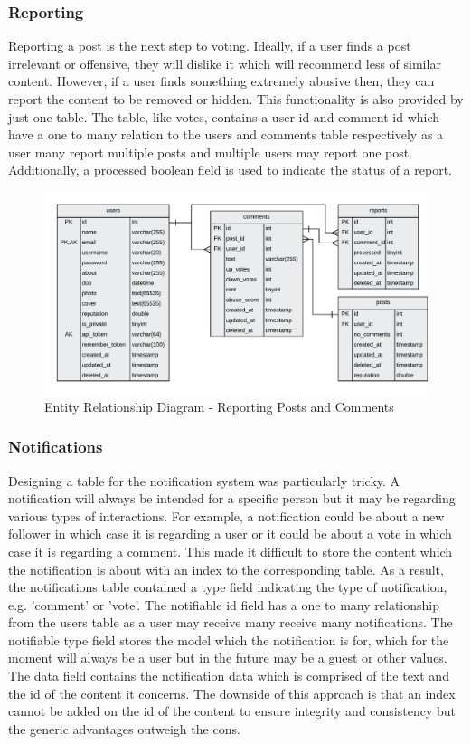 \subsubsection{Reporting}
Reporting a post is the next step to voting. Ideally, if a user finds a post irrelevant or offensive, they will dislike it which will recommend less of similar content. However, if a user finds something extremely abusive then, they can report the content to be removed or hidden. This functionality is also provided by just one table. The table, like votes, contains a user id and comment id which have a one to many relation to the users and comments table respectively as a user many report multiple posts and multiple users may report one post. Additionally, a processed boolean field is used to indicate the status of a report. 

\begin{figure}[H]
  \centering
  \includegraphics[width=1.0\textwidth]{Images/Design/Database/Reports}
  \caption{Entity Relationship Diagram - Reporting Posts and Comments} \label{fig:ERD_Reporting}
\end{figure}

\subsubsection{Notifications}
Designing a table for the notification system was particularly tricky. A notification will always be intended for a specific person but it may be regarding various types of interactions. For example, a notification could be about a new follower in which case it is regarding a user or it could be about a vote in which case it is regarding a comment. This made it difficult to store the content which the notification is about with an index to the corresponding table. As a result, the notifications table contained a type field indicating the type of notification, e.g. 'comment' or 'vote'. The notifiable id field has a one to many relationship from the users table as a user may receive many receive many notifications. The notifiable type field stores the model which the notification is for, which for the moment will always be a user but in the future may be a guest or other values. The data field contains the notification data which is comprised of the text and the id of the content it concerns. The downside of this approach is that an index cannot be added on the id of the content to ensure integrity and consistency but the generic advantages outweigh the cons.

